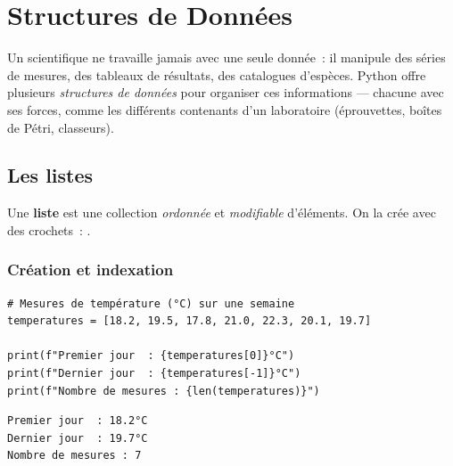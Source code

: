 \chapter{Structures de Donn\'ees}
\label{ch:structures}

\begin{intuition}
Un scientifique ne travaille jamais avec une seule donn\'ee~: il manipule des s\'eries de
mesures, des tableaux de r\'esultats, des catalogues d'esp\`eces. Python offre plusieurs
\emph{structures de donn\'ees} pour organiser ces informations --- chacune avec ses forces,
comme les diff\'erents contenants d'un laboratoire (\'eprouvettes, bo\^ites de P\'etri,
classeurs).
\end{intuition}

\section{Les listes}

\begin{definition}[Liste]
Une \textbf{liste} est une collection \emph{ordonn\'ee} et \emph{modifiable} d'\'el\'ements.
On la cr\'ee avec des crochets~: \py{[e1, e2, ...]}.
\end{definition}

\subsection{Cr\'eation et indexation}

\begin{codeblock}[title=\textbf{Python}]
\begin{verbatim}
# Mesures de température (°C) sur une semaine
temperatures = [18.2, 19.5, 17.8, 21.0, 22.3, 20.1, 19.7]

print(f"Premier jour  : {temperatures[0]}°C")
print(f"Dernier jour  : {temperatures[-1]}°C")
print(f"Nombre de mesures : {len(temperatures)}")
\end{verbatim}
\end{codeblock}

\begin{codeoutput}
\begin{verbatim}
Premier jour  : 18.2°C
Dernier jour  : 19.7°C
Nombre de mesures : 7
\end{verbatim}
\end{codeoutput}

